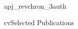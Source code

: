 \documentclass[12pt]{article}
\begin{document}
{apj_revchron_3auth}
%
%
%


{cv}{Selected Publications}


\vfill  
\nopagebreak



%


% 
% 
% 
% 
% 
% 
% 
% 
% 
% 
% 
% 
% 
% 
% 

%



\end{document}
